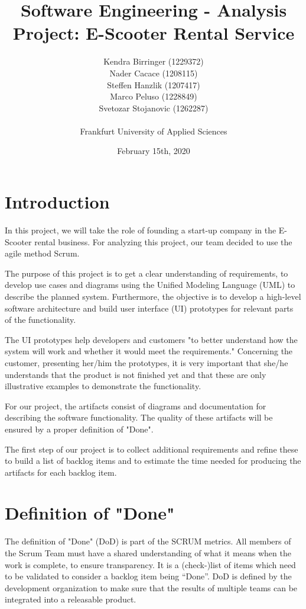 \documentclass[a4paper, 12pt]{article}
\title{Software Engineering - Analysis\\
Project: E-Scooter Rental Service}
\author{
    Kendra Birringer (1229372)\\
    Nader Cacace (1208115)\\
    Steffen Hanzlik (1207417)\\
    Marco Peluso (1228849)\\
    Svetozar Stojanovic (1262287)\\
    \\
    Frankfurt University of Applied Sciences
}
\date{February 15th, 2020}
\begin{document}
\maketitle
\newpage
\tableofcontents

\newpage
\section{Introduction}
In this project, we will take the role of founding a start-up company in the E-Scooter rental business.
For analyzing this project, our team decided to use the agile method Scrum.

The purpose of this project is to get a clear understanding of requirements, to develop use cases and diagrams using the Unified Modeling Language (UML) to describe the planned system.
Furthermore, the objective is to develop a high-level software architecture and build user interface (UI) prototypes for relevant parts of the functionality.

The UI prototypes help developers and customers "to better understand how the system will work and whether it would meet the requirements." \cite{thoma} 
Concerning the customer, presenting her/him the prototypes, it is very important that she/he understands that the product is not finished yet and that these are only illustrative examples to demonstrate the functionality.

For our project, the artifacts consist of diagrams and documentation for describing the software functionality. The quality of these artifacts will be ensured by a proper definition of "Done".

The first step of our project is to collect additional requirements and refine these to build a list of backlog items and to estimate the time needed for producing the artifacts for each backlog item.

\section{Definition of "Done"}
The definition of "Done" (DoD) is part of the SCRUM metrics. All members of the Scrum Team must have a shared understanding of what it means when the work is complete, to ensure transparency. \cite{scrumguide}
It is a (check-)list of items which need to be validated to consider a backlog item being “Done”. DoD is defined by the development organization to make sure that the results of multiple teams can be integrated into a releasable product. \cite{thoma1}
\end{document}
